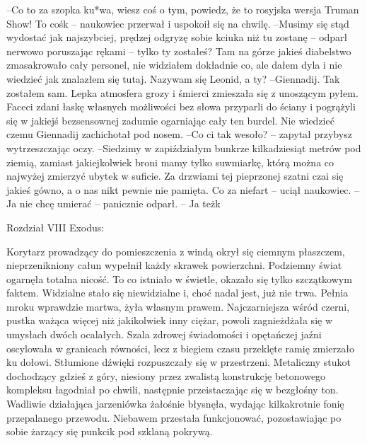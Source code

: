 \documentclass[../MAIN.tex]{subfiles}
\begin{document}
--Co to za szopka ku*wa, wiesz coś o tym, powiedz, że to rosyjska wersja Truman Show! To coś\3k -- naukowiec przerwał i uspokoił się na chwilę. 
--Musimy się stąd wydostać jak najszybciej, prędzej odgryzę sobie kciuka niż tu zostanę -- odparł nerwowo poruszając rękami -- tylko ty zostałeś? Tam na górze jakieś diabelstwo zmasakrowało cały personel, nie widziałem dokładnie co, ale dałem dyla i nie wiedzieć jak znalazłem się tutaj. Nazywam się Leonid, a ty? 
--Giennadij. Tak zostałem sam. 
Lepka atmosfera grozy i śmierci zmieszała się z unoszącym pyłem. Faceci zdani łaskę własnych możliwości bez słowa przyparli do ściany i pogrążyli się w jakiejś bezsensownej zadumie ogarniając cały ten burdel. Nie wiedzieć czemu Giennadij zachichotał pod nosem. 
--Co ci tak wesoło? -- zapytał przybysz wytrzeszczając oczy. 
--Siedzimy w zapiździałym bunkrze kilkadziesiąt metrów pod ziemią, zamiast jakiejkolwiek broni mamy tylko suwmiarkę, którą można co najwyżej zmierzyć ubytek w suficie. Za drzwiami tej pieprzonej szatni czai się jakieś gówno, a o nas nikt pewnie nie pamięta. Co za niefart -- uciął naukowiec. 
-- Ja nie chcę umierać -- panicznie odparł. 
-- Ja też\3k


Rozdział VIII
Exodus:  

Korytarz prowadzący do pomieszczenia z windą okrył się ciemnym płaszczem, nieprzenikniony całun wypełnił każdy skrawek powierzchni. Podziemny świat ogarnęła totalna nicość. To co istniało w świetle, okazało się tylko szczątkowym faktem. Widzialne stało się niewidzialne i, choć nadal jest, już nie trwa. Pełnia mroku wprawdzie martwa, żyła własnym prawem. Najczarniejsza wśród czerni, pustka ważąca więcej niż jakikolwiek inny ciężar, powoli zagnieżdżała się w umysłach dwóch ocalałych. Szala zdrowej świadomości i opętańczej jaźni oscylowała w granicach równości, lecz z biegiem czasu przeklęte ramię zmierzało ku dołowi. Stłumione dźwięki rozpuszczały się w przestrzeni. Metaliczny stukot dochodzący gdzieś z góry, niesiony przez zwalistą konstrukcję betonowego kompleksu łagodniał po chwili, następnie przeistaczając się w bezgłośny ton. Wadliwie działająca jarzeniówka żałośnie błysnęła, wydając kilkakrotnie fonię przepalanego przewodu. Niebawem przestała funkcjonować, pozostawiając po sobie żarzący się punkcik pod szklaną pokrywą. 
\end{document}
